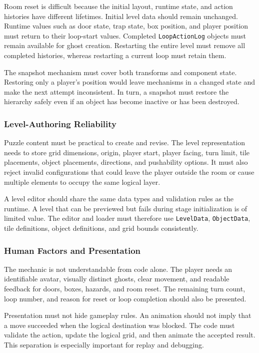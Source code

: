 Room reset is difficult because the initial layout, runtime state, and action histories have different lifetimes. Initial level data should remain unchanged. Runtime values such as door state, trap state, box position, and player position must return to their loop-start values. Completed \texttt{LoopActionLog} objects must remain available for ghost creation. Restarting the entire level must remove all completed histories, whereas restarting a current loop must retain them.

The snapshot mechanism must cover both transforms and component state. Restoring only a player's position would leave mechanisms in a changed state and make the next attempt inconsistent. In turn, a snapshot must restore the hierarchy safely even if an object has become inactive or has been destroyed.

\subsubsection{Level-Authoring Reliability}

Puzzle content must be practical to create and revise. The level representation needs to store grid dimensions, origin, player start, player facing, turn limit, tile placements, object placements, directions, and pushability options. It must also reject invalid configurations that could leave the player outside the room or cause multiple elements to occupy the same logical layer.

A level editor should share the same data types and validation rules as the runtime. A level that can be previewed but fails during stage initialization is of limited value. The editor and loader must therefore use \texttt{LevelData}, \texttt{ObjectData}, tile definitions, object definitions, and grid bounds consistently.

\subsubsection{Human Factors and Presentation}

The mechanic is not understandable from code alone. The player needs an identifiable avatar, visually distinct ghosts, clear movement, and readable feedback for doors, boxes, hazards, and room reset. The remaining turn count, loop number, and reason for reset or loop completion should also be presented.

Presentation must not hide gameplay rules. An animation should not imply that a move succeeded when the logical destination was blocked. The code must validate the action, update the logical grid, and then animate the accepted result. This separation is especially important for replay and debugging.

